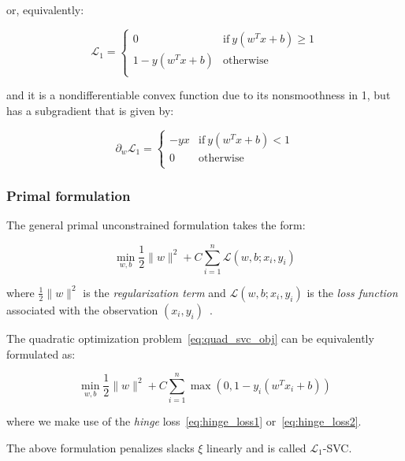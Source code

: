 or, equivalently:

\begin{equation} \label{eq:hinge_loss2}
	\mathcal{L}_1 = 
	\begin{cases}
		0 & \text{if} \ y (w^T x + b) \geq 1 \\
		1 - y (w^T x + b) & \text{otherwise} \\
	\end{cases}
\end{equation}

and it is a nondifferentiable convex function due to its nonsmoothness in 1, but has a subgradient that is given by:

\begin{equation} \label{eq:hinge_loss_der}
    \partial_w \mathcal{L}_1=
        \begin{cases}
            -y x & \text{if} \ y (w^T x + b) < 1 \\
            0 & \text{otherwise} \\ 
        \end{cases}
\end{equation}

\subsubsection{Primal formulation}

The general primal unconstrained formulation takes the form:

\begin{equation} \label{eq:primal_svm}
    \min_{w,b} \frac{1}{2} \| w \|^2 + C \sum_{i=1}^n \mathcal{L}(w,b;x_i,y_i)
\end{equation}

where $\displaystyle \frac{1}{2} \| w \|^2$ is the \emph{regularization term} and $\mathcal{L}(w,b;x_i,y_i)$ is the \emph{loss function} associated with the observation $(x_i,y_i)$~\cite{piccialli2018nonlinear}.

The quadratic optimization problem~\eqref{eq:quad_svc_obj} can be equivalently formulated as:

\begin{equation} \label{eq:primal_l1_svc}
    \min_{w,b} \frac{1}{2} \| w \|^2 + C \sum_{i=1}^n \max(0, 1 - y_i (w^T x_i + b))
\end{equation}

where we make use of the \emph{hinge} loss~\eqref{eq:hinge_loss1} or~\eqref{eq:hinge_loss2}.

The above formulation penalizes slacks $\xi$ linearly and is called $\mathcal{L}_1$-SVC.

